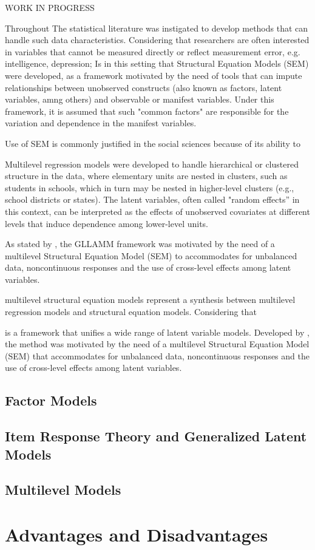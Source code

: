 {\color{red} WORK IN PROGRESS

Throughout The statistical literature was instigated to develop methods that can handle such data characteristics. Considering that researchers are often interested in variables that cannot be measured directly or reflect measurement error, e.g. intelligence, depression;  Is in this setting that Structural Equation Models (SEM) were developed, as a framework motivated by the need of tools that can impute relationships between unobserved constructs (also known as factors, latent variables, amng others) and observable or manifest variables. Under this framework, it is assumed that such "common factors" are responsible for the variation and dependence in the manifest variables.

Use of SEM is commonly justified in the social sciences because of its ability to 


Multilevel regression models were developed to handle hierarchical or clustered structure in the data, where elementary units are nested in clusters, such as students in schools, which in turn may be nested in higher-level clusters (e.g., school districts or states). The latent variables, often called "random effects” in this context, can be interpreted as the effects of unobserved covariates at different levels that induce dependence among lower-level units.

As stated by \citet{Rabe_et_al_2012}, the GLLAMM framework was motivated by the need of a multilevel Structural Equation Model (SEM) to accommodates for unbalanced data, noncontinuous responses and the use of cross-level effects among latent variables.

multilevel structural equation models represent a synthesis between multilevel regression models and structural equation models. Considering that 


is a framework that unifies a wide range of latent variable models. Developed by \citet{Rabe_et_al_2004a, Rabe_et_al_2004b, Rabe_et_al_2004c, Skrondal_et_al_2004a, Rabe_et_al_2012}, the method was motivated by the need of a multilevel Structural Equation Model (SEM) that accommodates for unbalanced data, noncontinuous responses and the use of cross-level effects among latent variables. 

}


\subsection{Factor Models}

\subsection{Item Response Theory and Generalized Latent Models}

\subsection{Multilevel Models}



\section{Advantages and Disadvantages}